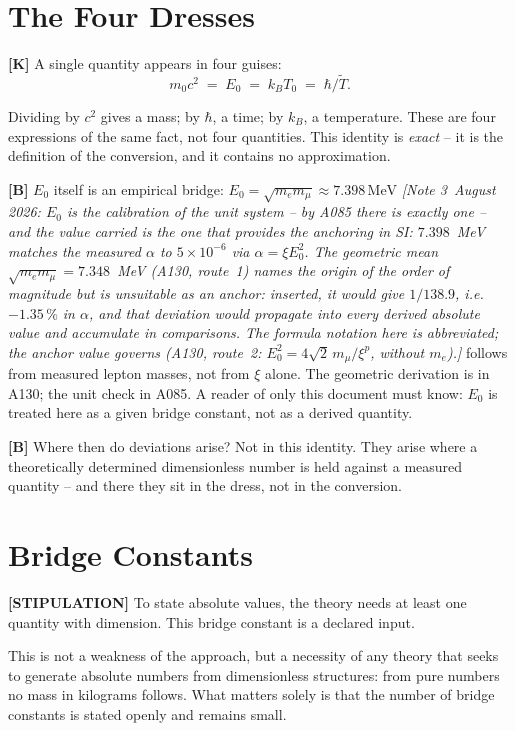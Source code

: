 \section{The Four Dresses}

\textbf{[K]} A single quantity appears in four guises:
\[
  m_0 c^2 \;=\; E_0 \;=\; k_B T_0 \;=\; \hbar/\tilde T .
\]

Dividing by $c^2$ gives a mass; by $\hbar$, a time; by $k_B$, a temperature.
These are four expressions of the same fact, not four quantities. This identity
is \emph{exact} -- it is the definition of the conversion, and it contains no
approximation.

\textbf{[B]} $E_0$ itself is an empirical bridge: $E_0=\sqrt{m_em_\mu}
\approx7{.}398\,\text{MeV}$ \emph{[Note 3~August 2026: $E_0$ is the calibration of the unit system -- by A085 there is exactly one -- and the value carried is the one that provides the anchoring in SI: $7{.}398$~MeV matches the measured $\alpha$ to $5\times10^{-6}$ via $\alpha = \xi E_0^2$. The geometric mean $\sqrt{m_em_\mu} = 7{.}348$~MeV (A130, route~1) names the origin of the order of magnitude but is unsuitable as an anchor: inserted, it would give $1/138{.}9$, i.e.\ $-1{.}35\,\%$ in $\alpha$, and that deviation would propagate into every derived absolute value and accumulate in comparisons. The formula notation here is abbreviated; the anchor value governs (A130, route~2: $E_0^2 = 4\sqrt2\,m_\mu/\xi^{p}$, without $m_e$).]} follows from measured lepton masses, not from $\xi$
alone. The geometric derivation is in A130; the unit check in A085. A reader
of only this document must know: $E_0$ is treated here as a given bridge
constant, not as a derived quantity.

\textbf{[B]} Where then do deviations arise? Not in this identity. They arise
where a theoretically determined dimensionless number is held against a measured
quantity -- and there they sit in the dress, not in the conversion.

\section{Bridge Constants}

\textbf{[STIPULATION]} To state absolute values, the theory needs at least one
quantity with dimension. This bridge constant is a declared input.

This is not a weakness of the approach, but a necessity of any theory that
seeks to generate absolute numbers from dimensionless structures: from pure
numbers no mass in kilograms follows. What matters solely is that the number of
bridge constants is stated openly and remains small.

